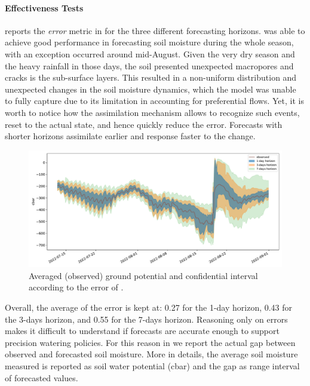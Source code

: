 \paragraph{Effectiveness Tests}  reports the \textit{error} metric in  for the three different forecasting horizons.
\olab{} was able to achieve good performance in forecasting soil moisture during the whole season, with an exception occurred around mid-August.
Given the very dry season and the heavy rainfall in those days, the soil presented unexpected macropores and cracks is the sub-surface layers.
This resulted in a non-uniform distribution and unexpected changes in the soil moisture dynamics, which the model was unable to fully capture due to its limitation in accounting for preferential flows.
Yet, it is worth to notice how the assimilation mechanism allows \olab{} to recognize such events, reset to the actual state, and hence quickly reduce the error.
Forecasts with shorter horizons assimilate earlier and response faster to the change.

\begin{figure}[t]
    \centering
    \includegraphics[scale=.4]{chapters/physics-aware/orchard/img/forecasting_std_with_forbidden_sensors.pdf}
    \caption{Averaged (observed) ground potential and confidential interval according to the error of .}
    \label{orchard-fig:forecasting_std}
\end{figure}

Overall, the average of the error is kept at: 0.27 for the 1-day horizon, 0.43 for the 3-days horizon, and 0.55 for the 7-days horizon.
Reasoning only on errors makes it difficult to understand if forecasts are accurate enough to support precision watering policies. For this reason in  we report the actual gap between observed and forecasted soil moisture.
More in details, the average soil moisture measured is reported as soil water potential (cbar) and the gap as range interval of forecasted values.

